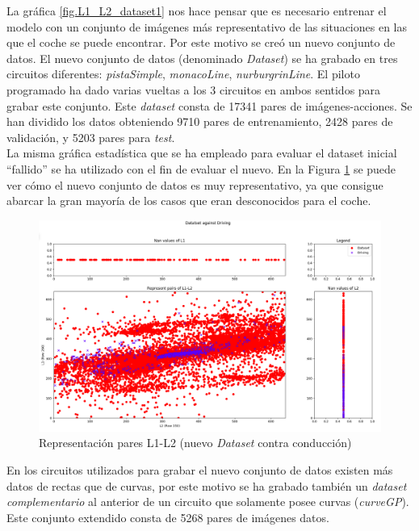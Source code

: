 La gráfica \ref{fig.L1_L2_dataset1} nos hace pensar que es necesario entrenar el modelo con un conjunto de imágenes más representativo de las situaciones en las que el coche se puede encontrar. Por este motivo se creó un nuevo conjunto de datos. El nuevo conjunto de datos (denominado \textit{Dataset}) se ha grabado en tres circuitos diferentes: \textit{pistaSimple}, \textit{monacoLine}, \textit{nurburgrinLine}. El piloto programado ha dado varias vueltas a los 3 circuitos en ambos sentidos para grabar este conjunto. Este \textit{dataset} consta de 17341 pares de imágenes-acciones. Se han dividido los datos obteniendo 9710 pares de entrenamiento, 2428 pares de validación, y 5203 pares para \textit{test}.\\

La misma gráfica estadística que se ha empleado para evaluar el dataset inicial ``fallido'' se ha utilizado con el fin de evaluar el nuevo. En la Figura \ref{fig.L1_L2_dataset3} se puede ver cómo el nuevo conjunto de datos es muy representativo, ya que consigue abarcar la gran mayoría de los casos que eran desconocidos para el coche.\\

\begin{figure}
  \begin{center}
    \includegraphics[width=1\textwidth]{figures/Infraestructura/L1_L2_Dataset3.png}
		\caption{Representación pares L1-L2 (nuevo \textit{Dataset} contra conducción)}
		\label{fig.L1_L2_dataset3}
		\end{center}
\end{figure}

En los circuitos utilizados para grabar el nuevo conjunto de datos existen más datos de rectas que de curvas, por este motivo se ha grabado también un \textit{dataset} \textit{complementario} al anterior de un circuito que solamente posee curvas (\textit{curveGP}). Este conjunto extendido  consta de 5268 pares de imágenes datos.\\

